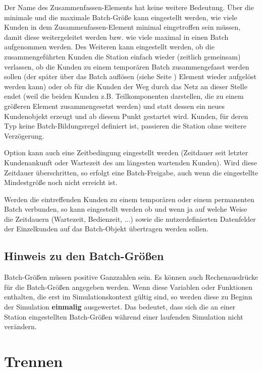 Der Name des Zusammenfassen-Elements hat keine weitere Bedeutung. Über die minimale und die maximale Batch-Größe kann
eingestellt werden, wie viele Kunden in dem Zusammenfassen-Element minimal eingetroffen sein müssen, damit diese 
weitergeleitet werden bzw. wie viele maximal in einen Batch aufgenommen werden. Des Weiteren kann eingestellt werden,
ob die zusammengeführten Kunden die Station einfach wieder (zeitlich gemeinsam) verlassen, ob die Kunden zu einem temporären
Batch zusammengefasst werden sollen (der später über das Batch auflösen (siehe Seite \pageref{ref:ModelElementSeparate}) Element
wieder aufgelöst werden kann) oder ob für die Kunden der Weg durch
das Netz an dieser Stelle endet (weil die beiden Kunden z.B. Teilkomponenten darstellen, die zu einem größeren Element
zusammengesetzt werden) und statt dessen ein neues Kundenobjekt erzeugt und ab diesem Punkt gestartet wird.
Kunden, für deren Typ keine Batch-Bildungsregel definiert ist, passieren die Station ohne weitere Verzögerung.

Option kann auch eine Zeitbedingung eingestellt werden (Zeitdauer seit letzter Kundenankunft oder Wartezeit des am längesten
wartenden Kunden). Wird diese Zeitdauer überschritten, so erfolgt eine Batch-Freigabe, auch wenn die eingestellte
Mindestgröße noch nicht erreicht ist.

Werden die eintreffenden Kunden zu einem temporären oder einem permanenten Batch verbunden, so kann eingestellt werden
ob und wenn ja auf welche Weise die Zeitdauern (Wartezeit, Bedienzeit, ...) sowie die nutzerdefinierten Datenfelder
der Einzelkunden auf das Batch-Objekt übertragen werden sollen.

\subsection*{Hinweis zu den Batch-Größen}

Batch-Größen müssen positive Ganzzahlen sein.
Es können auch Rechenausdrücke für die Batch-Größen angegeben werden.
Wenn diese Variablen oder Funktionen enthalten, die erst im Simulationskontext gültig sind, so werden diese zu Beginn der Simulation \textbf{einmalig} ausgewertet.
Das bedeutet, dass sich die an einer Station eingestellten Batch-Größen während einer laufenden Simulation nicht verändern.


\section{Trennen}
\label{ref:ModelElementSeparate}

